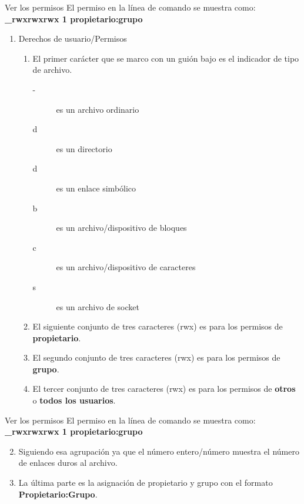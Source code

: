 \begin{frame}[c]{Ver los permisos}
  El permiso en la línea de comando se muestra como: \textbf{\_rwxrwxrwx 1
  propietario:grupo}

  \begin{enumerate}
    \item Derechos de usuario/Permisos
      \begin{enumerate}
        \item El primer carácter que se marco con un guión bajo es el indicador
          de tipo de archivo.
          \begin{description}
            \item [-] es un archivo ordinario
            \item [d] es un directorio
            \item [d] es un enlace simbólico
            \item [b] es un archivo/dispositivo de bloques
            \item [c] es un archivo/dispositivo de caracteres
            \item [s] es un archivo de socket
          \end{description}
        \item El siguiente conjunto de tres caracteres (rwx) es para los
          permisos de \textbf{propietario}.
        \item El segundo conjunto de tres caracteres (rwx) es para los
          permisos de \textbf{grupo}.
        \item El tercer conjunto de tres caracteres (rwx) es para los
          permisos de \textbf{otros} o \textbf{todos los usuarios}.
      \end{enumerate}
  \end{enumerate}
\end{frame}

\begin{frame}[c]{Ver los permisos}
  El permiso en la línea de comando se muestra como: \textbf{\_rwxrwxrwx 1
  propietario:grupo}

  \begin{enumerate}
    \setcounter{enumi}{1}
    \item Siguiendo esa agrupación ya que el número entero/número muestra el
      número de enlaces duros al archivo.
    \item La última parte es la asignación de propietario y grupo con el
      formato \textbf{Propietario:Grupo}.
  \end{enumerate}
\end{frame}


